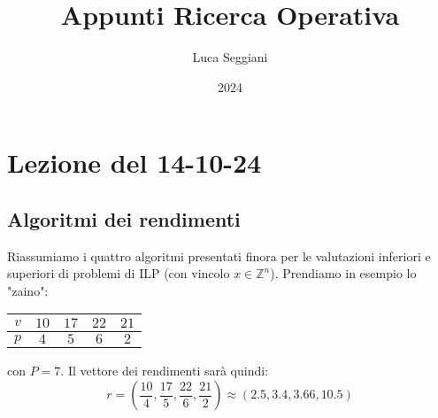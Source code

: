 \documentclass[a4paper,11pt]{article}
\title{Appunti Ricerca Operativa}
\author{Luca Seggiani}
\date{2024}
\begin{document}
\section{Lezione del 14-10-24}

\thispagestyle{empty}
\pagestyle{fancy}

\subsection{Algoritmi dei rendimenti}
Riassumiamo i quattro algoritmi presentati finora per le valutazioni inferiori e superiori di problemi di ILP (con vincolo $x \in \mathbb{Z}^n$). 
Prendiamo in esempio lo "zaino":\begin{table}[h!]
	\center 
	\begin{tabular} { c | c c c c }
		$v$ & $10$ & $17$ & $22$ & $21$ \\
		\hline 
		$p$ & $4$ & $5$ & $6$ & $2$ \\
	\end{tabular}
\end{table}
con $P = 7$.
Il vettore dei rendimenti sarà quindi:
$$
r = \left( \frac{10}{4}, \frac{17}{5}, \frac{22}{6}, \frac{21}{2} \right) \approx (2.5, 3.4, 3.66, 10.5)
$$
\end{document}
